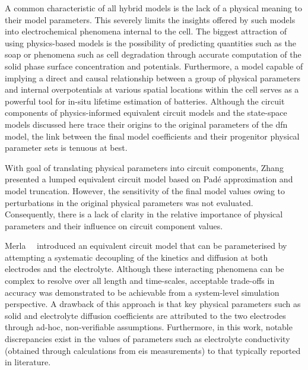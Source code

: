 A common characteristic of  all hybrid models is the lack  of a physical meaning
to their  model parameters. This  severely limits  the insights offered  by such
models  into  electrochemical  phenomena  internal  to  the  cell.  The  biggest
attraction  of  using physics-based  models  is  the possibility  of  predicting
quantities such as the \gls{soap} or  phenomena such as cell degradation through
accurate computation  of the solid  phase surface concentration  and potentials.
Furthermore,  a model  capable  of  implying a  direct  and causal  relationship
between a  group of physical  parameters and internal overpotentials  at various
spatial locations within the cell serves as a powerful tool for in-situ lifetime
estimation  of batteries.  Although the  circuit components  of physics-informed
equivalent circuit models and the  state-space models discussed here trace their
origins to the original parameters of  the \gls{dfn} model, the link between the
final model coefficients and their progenitor physical parameter sets is tenuous
at best.


With  goal   of  translating   physical  parameters  into   circuit  components,
Zhang~\etal{}~\cite{Zhang2017} presented a lumped equivalent circuit model based
on Padé  approximation and  model truncation. However,  the sensitivity  of the
final model  values owing to  perturbations in the original  physical parameters
was not  evaluated. Consequently,  there is  a lack of  clarity in  the relative
importance  of physical  parameters  and their  influence  on circuit  component
values.


Merla~\etal{}~\cite{Merla2018} introduced  an equivalent circuit model  that can
be  parameterised by  attempting a  systematic  decoupling of  the kinetics  and
diffusion at  both electrodes  and the  electrolyte. Although  these interacting
phenomena can be complex to resolve  over all length and time-scales, acceptable
trade-offs in  accuracy was  demonstrated to be  achievable from  a system-level
simulation  perspective.  A drawback  of  this  approach  is that  key  physical
parameters such as  solid and electrolyte diffusion  coefficients are attributed
to the  two electrodes through ad-hoc,  non-verifiable assumptions. Furthermore,
in  this work,  notable discrepancies  exist in  the values  of parameters  such
as  electrolyte  conductivity  (obtained  through  calculations  from  \gls{eis}
measurements) to that typically reported  in literature. 


